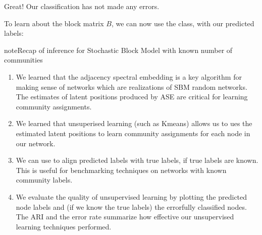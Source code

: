 \documentclass[letterpaper,10pt,english]{jupyterBook}
\begin{document}
\noindent{}

\sphinxAtStartPar
Great! Our classification has not made any errors.

\sphinxAtStartPar
To learn about the block matrix \(B\), we can now use the  class, with our predicted labels:

\begin{sphinxVerbatim}[commandchars=\\\{\}]
   

   
 
  
\end{sphinxVerbatim}

\noindent{}

\begin{sphinxadmonition}{note}{Recap of inference for Stochastic Block Model with known number of communities}
\begin{enumerate}
%
\item {} 
\sphinxAtStartPar
We learned that the adjacency spectral embedding is a key algorithm for making sense of networks which are realizations of SBM random networks. The estimates of latent positions produced by ASE are critical for learning community assignments.

\item {} 
\sphinxAtStartPar
We learned that unsuperised learning (such as K\sphinxhyphen{}means) allows us to ues the estimated latent positions to learn community assignments for each node in our network.

\item {} 
\sphinxAtStartPar
We can use  to align predicted labels with true labels, if true labels are known. This is useful for benchmarking techniques on networks with known community labels.

\item {} 
\sphinxAtStartPar
We evaluate the quality of unsupervised learning by plotting the predicted node labels and (if we know the true labels) the errorfully classified nodes. The ARI and the error rate summarize how effective our unsupervised learning techniques performed.

\end{enumerate}
\end{sphinxadmonition}
\end{document}
